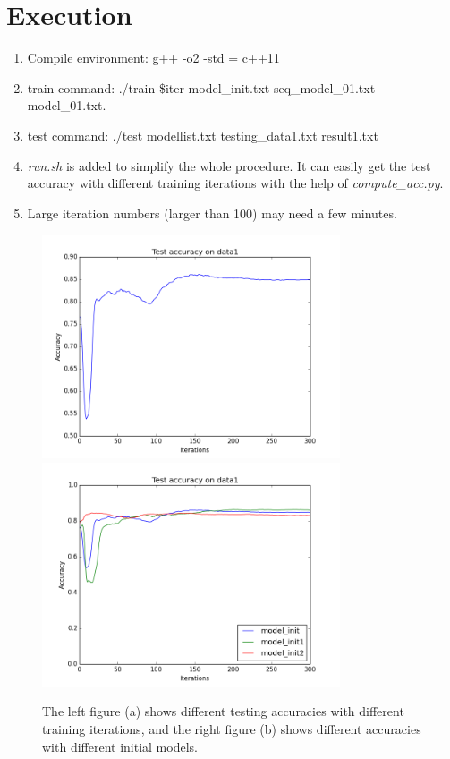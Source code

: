 \documentclass[11pt, oneside]{article}   	%
\begin{document}
\section{Execution}
\begin{enumerate}
\item Compile environment: g++ -o2 -std = c++11
\item train command: ./train \$iter model\_init.txt seq\_model\_01.txt model\_01.txt.
\item test command: ./test modellist.txt testing\_data1.txt result1.txt  
\item \emph{run.sh} is added to simplify the whole procedure. It can easily get the test accuracy with different training iterations with the help of \emph{compute\_acc.py}.
\item Large iteration numbers (larger than 100) may need a few minutes.
\end{enumerate}
\begin{figure}
\includegraphics[width=250pt]{exp.png}
\includegraphics[width=250pt]{exp2.png}
\caption{The left figure (a) shows different testing accuracies with different training iterations, and the right figure (b) shows different accuracies with different initial models.}
\end{figure}
\end{document}
